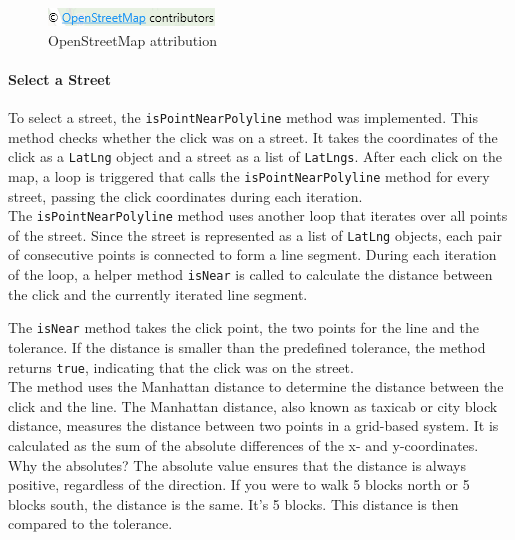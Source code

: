 \begin{figure}[H]
    \centering
    \includegraphics[width=0.2\linewidth]{images/AdminPanel/Openstreetmapverweis.png}
    \caption{OpenStreetMap attribution}
\end{figure}




\paragraph{Select a Street}
\label{fig:Select Street}

To select a street, the \texttt{isPointNearPolyline} method was implemented. This method checks whether the click was on a street. It takes the coordinates of the click as a \texttt{LatLng} object and a street as a list of \texttt{LatLngs}. After each click on the map, a loop is triggered that calls the \texttt{isPointNearPolyline} method for every street, passing the click coordinates during each iteration.\\

The \texttt{isPointNearPolyline} method uses another loop that iterates over all points of the street. Since the street is represented as a list of \texttt{LatLng} objects, each pair of consecutive points is connected to form a line segment. During each iteration of the loop, a helper method \texttt{isNear} is called to calculate the distance between the click and the currently iterated line segment.

\newpage

The \texttt{isNear} method takes the click point, the two points for the line and the tolerance. If the distance is smaller than the predefined tolerance, the method returns \texttt{true}, indicating that the click was on the street.\\

The method uses the Manhattan distance to determine the distance between the click and the line. The Manhattan distance, also known as taxicab or city block distance, measures the distance between two points in a grid-based system. It is calculated as the sum of the absolute differences of the x- and y-coordinates.\\
Why the absolutes? The absolute value ensures that the distance is always positive, regardless of the direction. If you were to walk 5 blocks north or 5 blocks south, the distance is the same. It's 5 blocks. This distance is then compared to the tolerance. \autocite{AlgoDaily2025Mar}

